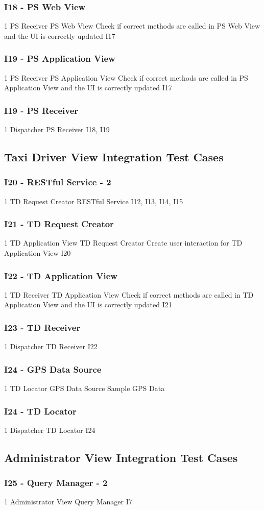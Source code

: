 \subsubsection{I18 - PS Web View}
\testCaseStdIn
	{1}
	{PS Receiver}
	{PS Web View}
	{Check if correct methods are called in PS Web View and the UI is correctly updated}
	{I17}
\subsubsection{I19 - PS Application View}
\testCaseStdIn
	{1}
	{PS Receiver}
	{PS Application View}
	{Check if correct methods are called in PS Application View and the UI is correctly updated}
	{I17}
\subsubsection{I19 - PS Receiver}
\testCaseStdInOut
	{1}
	{Dispatcher}
	{PS Receiver}
	{I18, I19}
\subsection{Taxi Driver View Integration Test Cases}
\subsubsection{I20 - RESTful Service - 2}
\testCaseStdInOut
	{1}
	{TD Request Creator}
	{RESTful Service}
	{I12, I13, I14, I15}
\subsubsection{I21 - TD Request Creator}
\testCaseStdOut
	{1}
	{TD Application View}
	{TD Request Creator}
	{Create user interaction for TD Application View}
	{I20}
\subsubsection{I22 - TD Application View}
\testCaseStdIn
	{1}
	{TD Receiver}
	{TD Application View}
	{Check if correct methods are called in TD Application View and the UI is correctly updated}
	{I21}
\subsubsection{I23 - TD Receiver}
\testCaseStdInOut
	{1}
	{Dispatcher}
	{TD Receiver}
	{I22}
\subsubsection{I24 - GPS Data Source}
\testCaseStdInOut
	{1}
	{TD Locator}
	{GPS Data Source}
	{Sample GPS Data}
\subsubsection{I24 - TD Locator}
\testCaseStdInOut
	{1}
	{Dispatcher}
	{TD Locator}
	{I24}
\subsection{Administrator View Integration Test Cases}
\subsubsection{I25 - Query Manager - 2}
\testCaseStdInOut
	{1}
	{Administrator View}
	{Query Manager}
	{I7}